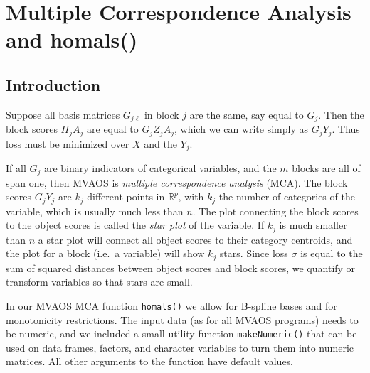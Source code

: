 \documentclass[
  12pt,
  letterpaper,
  DIV=11,
  numbers=noendperiod]{scrreprt}
\begin{document}

\chapter{Multiple Correspondence Analysis and
homals()}\label{multiple-correspondence-analysis-and-homals}

\section{Introduction}\label{introduction-1}

Suppose all basis matrices \(G_{j\ell}\) in block \(j\) are the same,
say equal to \(G_j\). Then the block scores \(H_jA_j\) are equal to
\(G_jZ_jA_j\), which we can write simply as \(G_jY_j\). Thus loss must
be minimized over \(X\) and the \(Y_j\).

If all \(G_j\) are binary indicators of categorical variables, and the
\(m\) blocks are all of span one, then MVAOS is \emph{multiple
correspondence analysis} (MCA). The block scores \(G_jY_j\) are \(k_j\)
different points in \(\mathbb{R}^p\), with \(k_j\) the number of
categories of the variable, which is usually much less than \(n\). The
plot connecting the block scores to the object scores is called the
\emph{star plot} of the variable. If \(k_j\) is much smaller than \(n\)
a star plot will connect all object scores to their category centroids,
and the plot for a block (i.e.~a variable) will show \(k_j\) stars.
Since loss \(\sigma\) is equal to the sum of squared distances between
object scores and block scores, we quantify or transform variables so
that stars are small.

In our MVAOS MCA function \texttt{homals()} we allow for B-spline bases
and for monotonicity restrictions. The input data (as for all MVAOS
programs) needs to be numeric, and we included a small utility function
\texttt{makeNumeric()} that can be used on data frames, factors, and
character variables to turn them into numeric matrices. All other
arguments to the function have default values.
\end{document}
